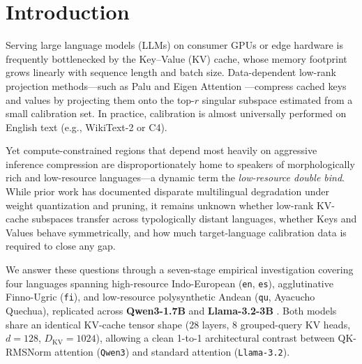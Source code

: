 \documentclass[11pt,a4paper,twocolumn]{article}
\begin{document}
\section{Introduction}
Serving large language models (LLMs) on consumer GPUs or edge hardware is frequently bottlenecked by the Key--Value (KV) cache, whose memory footprint grows linearly with sequence length and batch size. Data-dependent low-rank projection methods---such as Palu \citep{chang2025palu} and Eigen Attention \citep{saxena2024eigen}---compress cached keys and values by projecting them onto the top-$r$ singular subspace estimated from a small calibration set. In practice, calibration is almost universally performed on English text (e.g., WikiText-2 or C4).

Yet compute-constrained regions that depend most heavily on aggressive inference compression are disproportionately home to speakers of morphologically rich and low-resource languages---a dynamic \citet{marchisio2024quantization} term the \emph{low-resource double bind}. While prior work has documented disparate multilingual degradation under weight quantization and pruning, it remains unknown whether low-rank KV-cache subspaces transfer across typologically distant languages, whether Keys and Values behave symmetrically, and how much target-language calibration data is required to close any gap.

We answer these questions through a seven-stage empirical investigation covering four languages spanning high-resource Indo-European (\texttt{en}, \texttt{es}), agglutinative Finno-Ugric (\texttt{fi}), and low-resource polysynthetic Andean (\texttt{qu}, Ayacucho Quechua), replicated across \textbf{Qwen3-1.7B} \citep{yang2025qwen3} and \textbf{Llama-3.2-3B} \citep{grattafiori2024llama3}. Both models share an identical KV-cache tensor shape ($28$ layers, $8$ grouped-query KV heads, $d=128$, $D_{\text{KV}}=1024$), allowing a clean 1-to-1 architectural contrast between QK-RMSNorm attention (\texttt{Qwen3}) and standard attention (\texttt{Llama-3.2}).
\end{document}

